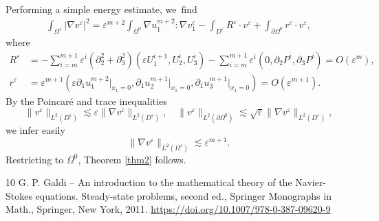 \documentclass[10pt,a4paper]{amsart}
\theoremstyle{plain}
\theoremstyle{definition}
\let\pa\partial
\let\na\nabla
\let\eps\varepsilon
\begin{document}
Performing a simple energy estimate, we~find
\begin{align*}
\int_{\Omega^\eps} |\na v^\eps|^2 = \eps^{m+2} \int_{\Omega^0} \na u_1^{m+2} : \na v_1^\eps - \int_{D^\eps} R^\eps \cdot v^\eps + \int_{\pa \Omega^0} r^\eps \cdot v^\eps,
\end{align*}
where
\begin{align*}
R^\eps & = - \sum_{i=m}^{m+1} \eps^i (\pa^2_2 + \pa^2_3) (\eps U^{i+1}_1,U^i_2,U^i_3) - \sum_{i=m}^{m+1} \eps^i (0, \pa_2 P^i, \pa_3 P^i) = O(\eps^m), \\
r^\eps & = \eps^{m+1}(\eps \pa_1 u^{m+2}_1\vert_{x_1=0},\pa_1 u^{m+1}_2\vert_{x_1=0}, \pa_1 u^{m+1}_3\vert_{x_1=0}) = O(\eps^{m+1}).
\end{align*}
By the Poincaré and trace inequalities
\[
\| v^\eps \|_{L^2(D^\eps)} \lesssim \eps \|\na v^\eps \|_{L^2(D^\eps)}, \quad \| v^\eps \|_{L^2(\pa\Omega^0)} \lesssim \sqrt{\eps} \|\na v^\eps \|_{L^2(D^\eps)},
\]
we infer easily
\[
\|\na v^\eps \|_{L^2(\Omega^\eps)} \lesssim \eps^{m+1}.
\]
Restricting to $\Omega^0$, Theorem \ref{thm2} follows.


\begin{thebibliography}{10}
 G. P. Galdi – An introduction to the mathematical theory of the Navier-Stokes equations. Steady-state problems, second ed., Springer Monographs in Math., Springer, New York, 2011. \url{https://doi.org/10.1007/978-0-387-09620-9}
\end{thebibliography}
\end{document}

